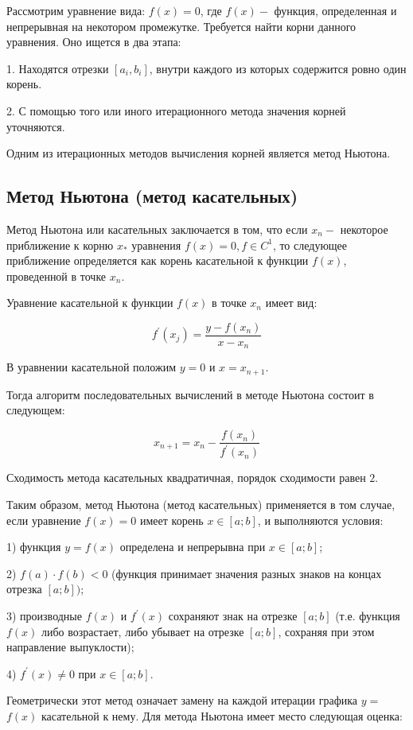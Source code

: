 \documentclass[a4paper,12pt]{article}
\begin{document}
Рассмотрим уравнение вида: $f(x)=0$, где $f(x)-$ функция, определенная и непрерывная на некотором промежутке. Требуется найти корни данного уравнения. Оно ищется в два этапа:

1. Находятся отрезки $\left[a_{i}, b_{i}\right]$, внутри каждого из которых содержится ровно один корень.

2. С помощью того или иного итерационного метода значения корней уточняются.

Одним из итерационных методов вычисления корней является метод Ньютона.

\subsection{Метод Ньютона (метод касательных)}

Метод Ньютона или касательных заключается в том, что если $x_{n}-$ некоторое приближение к корню $x_{*}$ уравнения $f(x)=0, f \in C^{1}$, то следующее приближение определяется как корень касательной к функции $f(x)$, проведенной в точке $x_{n}$.

Уравнение касательной к функции $f(x)$ в точке $x_{n}$ имеет вид:

$$
f^{\prime}\left(x_{j}\right)=\frac{y-f\left(x_{n}\right)}{x-x_{n}}
$$

В уравнении касательной положим $y=0$ и $x=x_{n+1}$.

Тогда алгоритм последовательных вычислений в методе Ньютона состоит в следующем:

$$
x_{n+1}=x_{n}-\frac{f\left(x_{n}\right)}{f^{\prime}\left(x_{n}\right)}
$$

Сходимость метода касательных квадратичная, порядок сходимости равен $2 .$

Таким образом, метод Ньютона (метод касательных) применяется в том случае, если уравнение $f(x)=0$ имеет корень $x \in[a ; b]$, и выполняются условия:

1) функция $y=f(x)$ определена и непрерывна при $x \in[a ; b]$;

2) $f(a) \cdot f(b)<0$ (функция принимает значения разных знаков на концах отрезка $[a ; b])$;

3) производные $f(x)$ и $f^{\prime}(x)$ сохраняют знак на отрезке $[a ; b]$ (т.е. функция $f(x)$ либо возрастает, либо убывает на отрезке $[a ; b]$, сохраняя при этом направление выпуклости);

4) $f^{\prime}(x) \neq 0$ при $x \in[a ; b]$.

Геометрически этот метод означает замену на каждой итерации графика $y=$ $f(x)$ касательной к нему. Для метода Ньютона имеет место следующая оценка:
\end{document}
